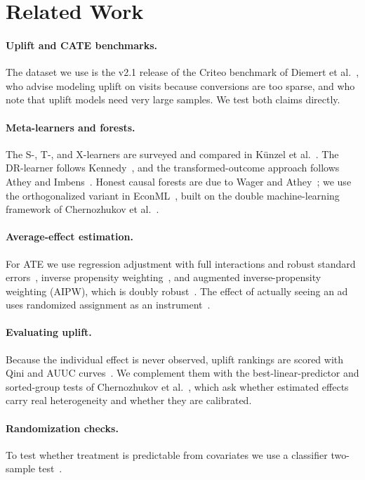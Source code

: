 \section{Related Work}
\label{sec:related}

\paragraph{Uplift and CATE benchmarks.} The dataset we use is the v2.1
release of the Criteo benchmark of Diemert et
al.~\cite{diemert2021}, who advise modeling uplift on visits because
conversions are too sparse, and who note that uplift models need very large
samples. We test both claims directly.

\paragraph{Meta-learners and forests.} The S-, T-, and X-learners are
surveyed and compared in K{\"u}nzel et al.~\cite{kunzel2019}. The DR-learner
follows Kennedy~\cite{kennedy2023}, and the transformed-outcome approach
follows Athey and Imbens~\cite{athey2015}. Honest causal forests are due to
Wager and Athey~\cite{wager2018}; we use the orthogonalized variant in
EconML~\cite{econml}, built on the double machine-learning framework of
Chernozhukov et al.~\cite{chernozhukov2018}.

\paragraph{Average-effect estimation.} For ATE we use regression adjustment
with full interactions and robust standard errors~\cite{lin2013}, inverse
propensity weighting~\cite{rosenbaum1983}, and augmented inverse-propensity
weighting (AIPW), which is doubly robust~\cite{robins1994}. The effect of
actually seeing an ad uses randomized assignment as an
instrument~\cite{imbens1994}.

\paragraph{Evaluating uplift.} Because the individual effect is never
observed, uplift rankings are scored with Qini and AUUC
curves~\cite{radcliffe2007}. We complement them with the best-linear-predictor
and sorted-group tests of Chernozhukov et al.~\cite{chernozhukov2018gates},
which ask whether estimated effects carry real heterogeneity and whether
they are calibrated.

\paragraph{Randomization checks.} To test whether treatment is predictable
from covariates we use a classifier two-sample test~\cite{lopezpaz2017}.

